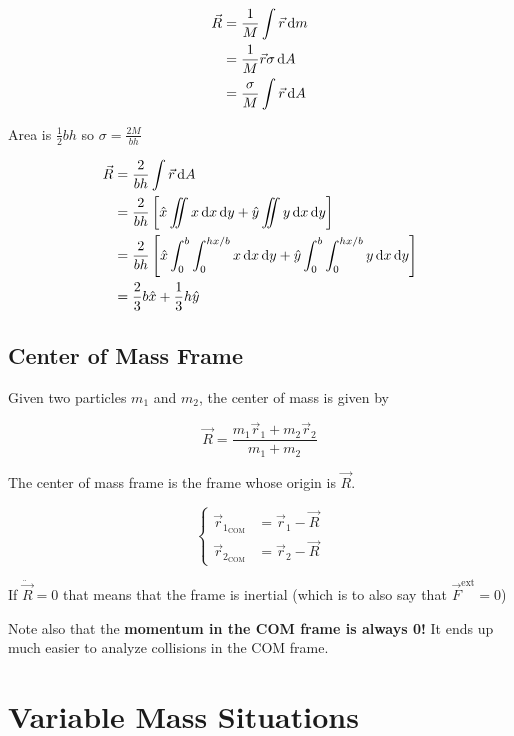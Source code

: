 \begin{sol}
	\begin{align}
		\vec R &= \frac{1}{M} \int \vec r \D m\\
		&= \frac{1}{M} \vec r \sigma \D A\\
		&= \frac{\sigma}{M} \int \vec r \D A
	\end{align}

	Area is $\frac{1}{2}bh$ so $\sigma = \frac{2M}{bh}$

	\begin{align}
		\vec R &= \frac{2}{bh} \int \vec r \D A\\
		&= \frac{2}{bh} \left[\hat x \iint x \D x \D y + \hat y \iint y \D x \D y\right]\\
		&= \frac{2}{bh} \left[\hat x \int_0^b\int_0^{hx/b} x \D x \D y + \hat y \int_0^b\int_0^{hx/b} y \D x \D y\right]\\
		&= \frac{2}{3} b \hat x + \frac{1}{3} h \hat y
	\end{align}
\end{sol}

\subsection{Center of Mass Frame}

Given two particles $m_1$ and $m_2$, the center of mass is given by

\begin{equation}
	\vec R = \frac{m_1 \vec r_1 + m_2 \vec r_2}{m_1 + m_2}
\end{equation}

The center of mass frame is the frame whose origin is $\vec R$.

\begin{equation}
	\begin{cases}
		\vec r_{1_\mathrm{COM}} &= \vec r_1 - \vec R\\
		\vec r_{2_\mathrm{COM}} &= \vec r_2 - \vec R
	\end{cases}
\end{equation}

If $\ddot{\vec{R}} = 0$ that means that the frame is inertial (which is to also say that $\vec F^\mathrm{ext} = 0$)

Note also that the \textbf{momentum in the COM frame is always 0!} It ends up much easier to analyze collisions in the COM frame.

\section{Variable Mass Situations}

